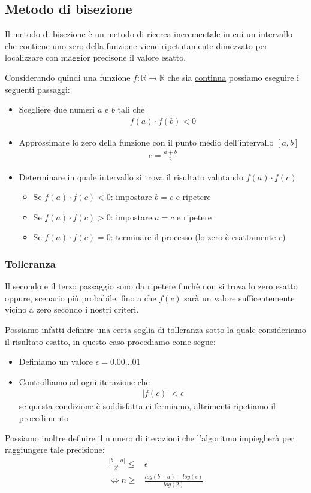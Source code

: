 \documentclass[../main.tex]{subfiles}
\begin{document}
\subsection{Metodo di bisezione}
Il metodo di bisezione è un metodo di ricerca incrementale in cui un intervallo che contiene uno zero della funzione viene ripetutamente 
dimezzato per localizzare con maggior precisone il valore esatto.

Considerando quindi una funzione $f: \mathbb{R} \longrightarrow \mathbb{R}$ che sia \underline{continua} possiamo eseguire i seguenti 
passaggi:
\begin{itemize}
    \item Scegliere due numeri $a$ e $b$ tali che \begin{align*}
        f(a) \cdot f(b) < 0
    \end{align*}
    \item Approssimare lo zero della funzione con il punto medio dell'intervallo $[a, b]$ \begin{align*}
        c = \frac{a + b}{2}
    \end{align*}
    \item Determinare in quale intervallo si trova il risultato valutando $f(a) \cdot f(c)$
    \begin{itemize}
        \item Se $f(a) \cdot f(c) < 0$: impostare $b = c$ e ripetere
        \item Se $f(a) \cdot f(c) > 0$: impostare $a = c$ e ripetere
        \item Se $f(a) \cdot f(c) = 0$: terminare il processo (lo zero è esattamente $c$)
    \end{itemize}
\end{itemize}

\vspace{1cm}
\subsubsection{Tolleranza}
Il secondo e il terzo passaggio sono da ripetere finchè non si trova lo zero esatto oppure, scenario più probabile, fino a che $f(c)$
sarà un valore sufficentemente vicino a zero secondo i nostri criteri.

Possiamo infatti definire una certa soglia di tolleranza sotto la quale consideriamo il risultato esatto, in questo caso procediamo come segue:
\begin{itemize}
    \item Definiamo un valore $\epsilon = 0.00...01$
    \item Controlliamo ad ogni iterazione che \begin{align*}
        \left\lvert f(c) \right\rvert < \epsilon
    \end{align*}
    se questa condizione è soddisfatta ci fermiamo, altrimenti ripetiamo il procedimento
\end{itemize}

Possiamo inoltre definire il numero di iterazioni che l'algoritmo impiegherà per raggiungere tale precisione:
\begin{align*}
    \frac{\left\lvert b - a\right\rvert }{2^n} \leq& \epsilon \\
    \Longleftrightarrow n \geq& \frac{log(b-a) - log(\epsilon)}{log(2)}
\end{align*}
\end{document}
